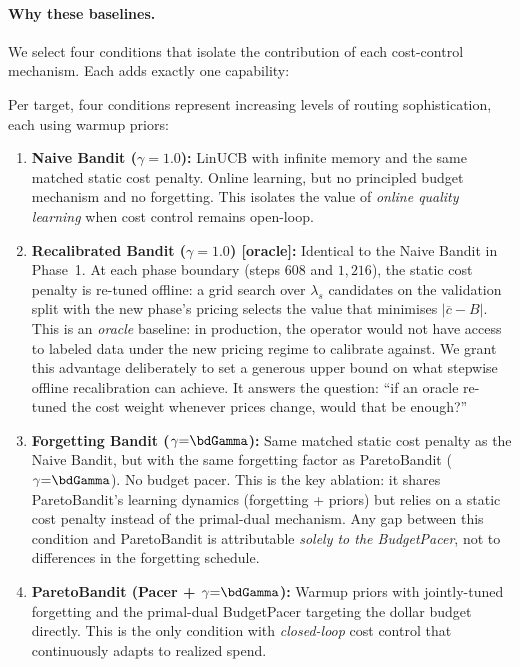 \paragraph{Why these baselines.}
We select four conditions that isolate the contribution of each
cost-control mechanism.  Each adds exactly one capability:

\noindent
Per target, four conditions represent increasing levels of
routing sophistication, each using warmup priors:
\begin{enumerate}[nosep,leftmargin=*]
  \item \textbf{Naive Bandit ($\gamma{=}1.0$):}
    LinUCB with infinite memory and the same matched static
    cost penalty.  Online learning, but no principled budget
    mechanism and no forgetting.
    This isolates the value of \emph{online quality learning}
    when cost control remains open-loop.
  \item \textbf{Recalibrated Bandit ($\gamma{=}1.0$) [oracle]:}
    Identical to the Naive Bandit in Phase~1.  At each phase
    boundary (steps $608$ and $1{,}216$), the static cost penalty
    is re-tuned offline: a grid search over $\lambda_s$ candidates
    on the validation split with the new phase's pricing selects
    the value that minimises
    $|\overline{c} - B|$.
    This is an \emph{oracle} baseline: in production, the operator
    would not have access to labeled data under the new pricing
    regime to calibrate against.  We grant this advantage
    deliberately to set a generous upper bound on what stepwise
    offline recalibration can achieve.
    It answers the question: ``if an oracle re-tuned the cost weight
    whenever prices change, would that be enough?''
  \item \textbf{Forgetting Bandit ($\gamma{=}\bdGamma$):}
    Same matched static cost penalty as the Naive Bandit, but with
    the same forgetting factor as ParetoBandit ($\gamma{=}\bdGamma$).
    No budget pacer.  This is the key ablation: it shares
    ParetoBandit's learning dynamics (forgetting + priors) but
    relies on a static cost penalty instead of the primal-dual
    mechanism.  Any gap between this condition and ParetoBandit
    is attributable \emph{solely to the BudgetPacer}, not to
    differences in the forgetting schedule.
  \item \textbf{ParetoBandit (Pacer + $\gamma{=}\bdGamma$):}
    Warmup priors with jointly-tuned forgetting and the
    primal-dual BudgetPacer targeting the dollar budget directly.
    This is the only condition with \emph{closed-loop} cost
    control that continuously adapts to realized spend.
\end{enumerate}

